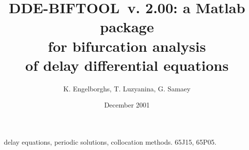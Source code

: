 %


\gdef \DDEBIFCODE{{DDE-BIFTOOL}}

\title{{\DDEBIFCODE\ v. 2.00}: a Matlab package \\ for bifurcation analysis \\
          of delay differential equations} 

\author{K. Engelborghs, T. Luzyanina, G. Samaey}   

\date{December 2001}



\begin{coverpage}

\begin{abstract}
\begin{quotation}             

\end{quotation}
\end{abstract}

\keywords delay equations, periodic solutions, collocation methods.   
\AMS \Primary 65J15,            %
     \Secondary 65P05.          %

\end{coverpage}


